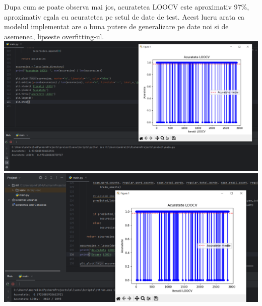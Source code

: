 \documentclass[11pt,leqno]{article}
\begin{document}
	{\normalsize 
		Dupa cum se poate observa mai jos, acuratetea LOOCV este aproximativ 97\%, aproximativ egala cu acuratetea pe setul de date de test. Acest lucru arata ca modelul implementat are o buna putere de generalizare pe date noi si de asemenea, lipseste overfitting-ul.\\
		\includegraphics[scale=0.5]{acuratete}\\
		\includegraphics[scale=0.5]{acurateteloocv2}
	}
\end{document}
